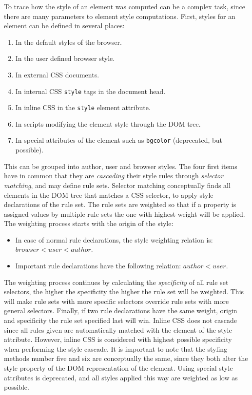 \documentclass[a4paper,11pt]{kth-mag}
\newcommand{\code}[1]{\texttt{#1}}
\begin{document}
        To trace how the style of an \gls{element} was computed can be a complex task, since there are many parameters to \gls{element} style computations.
        First, styles for an \gls{element} can be defined in several places:
        \begin{enumerate}
          \item In the default styles of the \gls{browser}.
          \item In the user defined \gls{browser} style.
          \item In external \gls{CSS} \glspl{document}.
          \item In internal \gls{CSS} \code{style} tags in the \gls{document} head.
          \item In inline \gls{CSS} in the \code{style} \gls{element} attribute.
          \item In scripts modifying the \gls{element} style through the \gls{DOM} tree.
          \item In special attributes of the \gls{element} such as \code{bgcolor} (deprecated, but possible).
        \end{enumerate}
        This can be grouped into author, user and \gls{browser} styles.
        The four first items have in common that they are \emph{cascading} their style rules through \emph{selector matching}, and may define rule sets.
        Selector matching conceptually finds all \glspl{element} in the \gls{DOM} tree that matches a \gls{CSS} selector, to apply style declarations of the rule set.
        The rule sets are weighted so that if a property is assigned values by multiple rule sets the one with highest weight will be applied.
        The weighting process starts with the origin of the style:
        \begin{itemize}
          \item In case of normal rule declarations, the style weighting relation is: $browser < user < author$.
          \item Important rule declarations have the following relation: $author < user$.
        \end{itemize}
        The weighting process continues by calculating the \emph{specificity} of all rule set selectors, the higher the specificity the higher the rule set will be weighted. 
        This will make rule sets with more specific selectors override rule sets with more general selectors.
        Finally, if two rule declarations have the same weight, origin and specificity the rule set specified last will win.
        Inline \gls{CSS} does not cascade since all rules given are automatically matched with the \gls{element} of the style attribute.
        However, inline \gls{CSS} is considered with highest possible specificity when performing the style cascade.
        It is important to note that the styling methods number five and six are conceptually the same, since they both alter the style property of the \gls{DOM} representation of the \gls{element}.
        Using special style attributes is deprecated, and all styles applied this way are weighted as low as possible.
\end{document}
